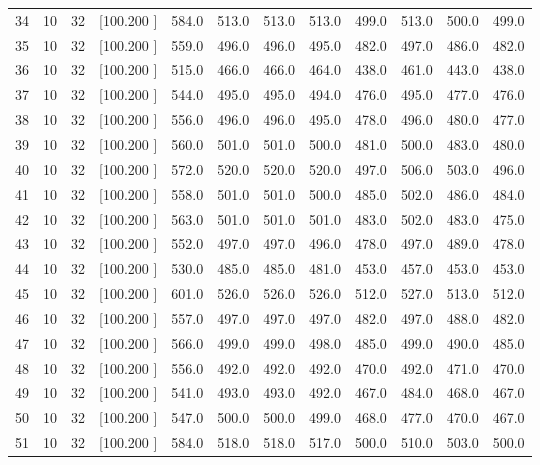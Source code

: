 \documentclass[12pt,a4paper]{article}
\begin{document}
\begin{center}
{\begin{tabular}{r r r r r r r r r r r r}
  34& 10& 32&[100.200   ]&   584.0&   513.0&   513.0&   513.0&   499.0&   513.0&   500.0&   499.0\\[-0.02in]
  35& 10& 32&[100.200   ]&   559.0&   496.0&   496.0&   495.0&   482.0&   497.0&   486.0&   482.0\\[-0.02in]
  36& 10& 32&[100.200   ]&   515.0&   466.0&   466.0&   464.0&   438.0&   461.0&   443.0&   438.0\\[-0.02in]
  37& 10& 32&[100.200   ]&   544.0&   495.0&   495.0&   494.0&   476.0&   495.0&   477.0&   476.0\\[-0.02in]
  38& 10& 32&[100.200   ]&   556.0&   496.0&   496.0&   495.0&   478.0&   496.0&   480.0&   477.0\\[-0.02in]
  39& 10& 32&[100.200   ]&   560.0&   501.0&   501.0&   500.0&   481.0&   500.0&   483.0&   480.0\\[-0.02in]
  40& 10& 32&[100.200   ]&   572.0&   520.0&   520.0&   520.0&   497.0&   506.0&   503.0&   496.0\\[-0.02in]
  41& 10& 32&[100.200   ]&   558.0&   501.0&   501.0&   500.0&   485.0&   502.0&   486.0&   484.0\\[-0.02in]
  42& 10& 32&[100.200   ]&   563.0&   501.0&   501.0&   501.0&   483.0&   502.0&   483.0&   475.0\\[-0.02in]
  43& 10& 32&[100.200   ]&   552.0&   497.0&   497.0&   496.0&   478.0&   497.0&   489.0&   478.0\\[-0.02in]
  44& 10& 32&[100.200   ]&   530.0&   485.0&   485.0&   481.0&   453.0&   457.0&   453.0&   453.0\\[-0.02in]
  45& 10& 32&[100.200   ]&   601.0&   526.0&   526.0&   526.0&   512.0&   527.0&   513.0&   512.0\\[-0.02in]
  46& 10& 32&[100.200   ]&   557.0&   497.0&   497.0&   497.0&   482.0&   497.0&   488.0&   482.0\\[-0.02in]
  47& 10& 32&[100.200   ]&   566.0&   499.0&   499.0&   498.0&   485.0&   499.0&   490.0&   485.0\\[-0.02in]
  48& 10& 32&[100.200   ]&   556.0&   492.0&   492.0&   492.0&   470.0&   492.0&   471.0&   470.0\\[-0.02in]
  49& 10& 32&[100.200   ]&   541.0&   493.0&   493.0&   492.0&   467.0&   484.0&   468.0&   467.0\\[-0.02in]
  50& 10& 32&[100.200   ]&   547.0&   500.0&   500.0&   499.0&   468.0&   477.0&   470.0&   467.0\\[-0.02in]
  51& 10& 32&[100.200   ]&   584.0&   518.0&   518.0&   517.0&   500.0&   510.0&   503.0&   500.0\\[-0.02in]

\end{tabular}}
\end{center}
\end{document}

